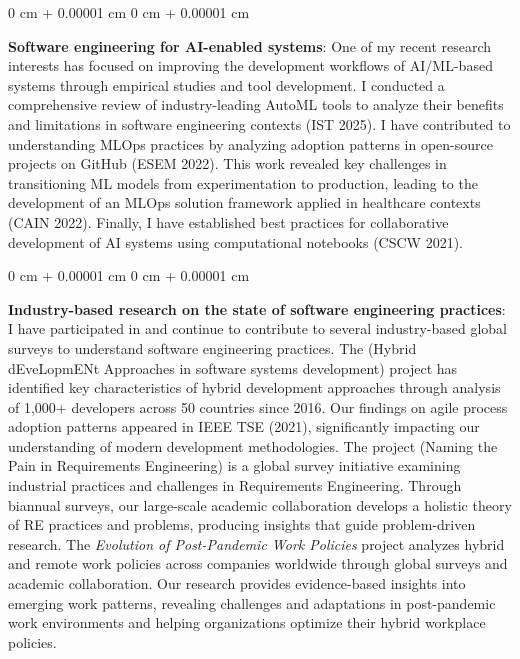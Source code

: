 \documentclass[10pt, a4paper]{article}
\newenvironment{onecolentry}{
    \begin{adjustwidth}{
        0 cm + 0.00001 cm
    }{
        0 cm + 0.00001 cm
    }
}{
    \end{adjustwidth}
} %
\let\hrefWithoutArrow\href
\renewcommand{\href}[2]{\hrefWithoutArrow{#1}{\ifthenelse{\equal{#2}{}}{ }{#2 }\raisebox{.15ex}{\footnotesize \faExternalLink*}}}
\begin{document}
        \vspace{0.2 cm}

        \begin{onecolentry}
            \textbf{Software engineering for AI-enabled systems}: One of my recent research interests has focused on improving the development workflows of AI/ML-based systems through empirical studies and tool development. I conducted a comprehensive review of industry-leading AutoML tools to analyze their benefits and limitations in software engineering contexts (IST 2025). I have contributed to understanding MLOps practices by analyzing adoption patterns in open-source projects on GitHub (ESEM 2022). This work revealed key challenges in transitioning ML models from experimentation to production, leading to the development of an MLOps solution framework applied in healthcare contexts (CAIN 2022). Finally, I have established best practices for collaborative development of AI systems using computational notebooks (CSCW 2021).
        \end{onecolentry}

        \vspace{0.2 cm}

        \begin{onecolentry}
            \textbf{Industry-based research on the state of software engineering practices}: I have participated in and continue to contribute to several industry-based global surveys to understand software engineering practices. The \href{https://helenastudy.wordpress.com/helena-team}{\textit{HELENA}} (Hybrid dEveLopmENt Approaches in software systems development) project has identified key characteristics of hybrid development approaches through analysis of 1,000+ developers across 50 countries since 2016. Our findings on agile process adoption patterns appeared in IEEE TSE (2021), significantly impacting our understanding of modern development methodologies. The \href{http://www.napire.org}{\textit{NaPiRE}} project (Naming the Pain in Requirements Engineering) is a global survey initiative examining industrial practices and challenges in Requirements Engineering. Through biannual surveys, our large-scale academic collaboration develops a holistic theory of RE practices and problems, producing insights that guide problem-driven research. The \textit{Evolution of Post-Pandemic Work Policies} project analyzes hybrid and remote work policies across companies worldwide through global surveys and academic collaboration. Our research provides evidence-based insights into emerging work patterns, revealing challenges and adaptations in post-pandemic work environments and helping organizations optimize their hybrid workplace policies.
        \end{onecolentry}
\end{document}
